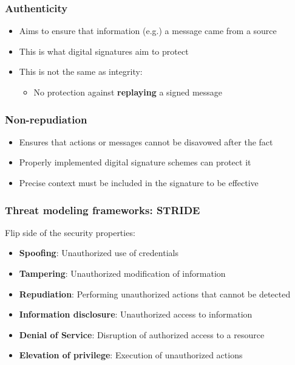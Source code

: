 \begin{frame}
  \frametitle{Authenticity}
  \begin{itemize}
    \item Aims to ensure that information (e.g.) a message came from a source
    \item This is what digital signatures aim to protect
    \item This is not the same as integrity:
    \begin{itemize}
      \item No protection against \textbf{replaying} a signed message
    \end{itemize}
  \end{itemize}
\end{frame}

\begin{frame}
  \frametitle{Non-repudiation}
  \begin{itemize}
    \item Ensures that actions or messages cannot be disavowed after the fact
    \item Properly implemented digital signature schemes can protect it
    \item Precise context must be included in the signature to be effective
  \end{itemize}
\end{frame}


\begin{frame}
  \frametitle{Threat modeling frameworks: STRIDE}
  Flip side of the security properties:
  \begin{itemize}
    \item \textbf{Spoofing}: Unauthorized use of credentials
    \item \textbf{Tampering}: Unauthorized modification of information
    \item \textbf{Repudiation}: Performing unauthorized actions that cannot be detected
    \item \textbf{Information disclosure}: Unauthorized access to information
    \item \textbf{Denial of Service}: Disruption of authorized access to a resource
    \item \textbf{Elevation of privilege}: Execution of unauthorized actions
  \end{itemize}
\end{frame}

